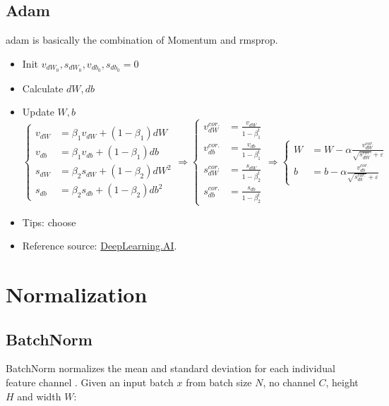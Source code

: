 \subsection{Adam}
\ac{adam} is basically the combination of Momentum and \ac{rmsprop}.
\begin{itemize}
	\item Init $v_{dW_0}, s_{dW_0}, v_{db_0}, s_{db_0}=0$
	\item Calculate $dW, db$
	\item Update $W, b$
	\begin{equation}
		\begin{cases}
			v_{dW} &= \beta_1 v_{dW} + (1-\beta_1)dW \\
			v_{db} &= \beta_1 v_{db} + (1-\beta_1)db \\
			s_{dW} &= \beta_2 s_{dW} + (1-\beta_2)dW^2 \\
			s_{db} &= \beta_2 s_{db} + (1-\beta_2)db^2
		\end{cases}
		\Rightarrow
		\begin{cases}
			v^{cor.}_{dW} &= \frac{v_{dW}}{1 - \beta_1^t} \\
			v^{cor.}_{db} &= \frac{v_{db}}{1 - \beta_1^t} \\
			s^{cor.}_{dW} &= \frac{s_{dW}}{1 - \beta_2^t} \\
			s^{cor.}_{db} &= \frac{s_{db}}{1 - \beta_2^t}
		\end{cases}
		\Rightarrow
		\begin{cases}
			W &= W - \alpha \frac{v^{cor.}_{dW}}{\sqrt{s^{cor.}_{dW}} + \varepsilon}\\
			b &= b - \alpha \frac{v^{cor.}_{db}}{\sqrt{s^{cor.}_{db}} + \varepsilon}
		\end{cases}
	\end{equation}
	\item Tips: choose 
	\item Reference source: \href{https://youtu.be/JXQT_vxqwIs}{DeepLearning.AI}.
\end{itemize}

\section{Normalization}
\subsection{BatchNorm}
\ac{BatchNorm} normalizes the mean and standard deviation for each individual feature channel \cite{ioffe2015batch}. Given an input batch $x$ from batch size $N$, \ac{no} channel $C$, height $H$ and width $W$:

